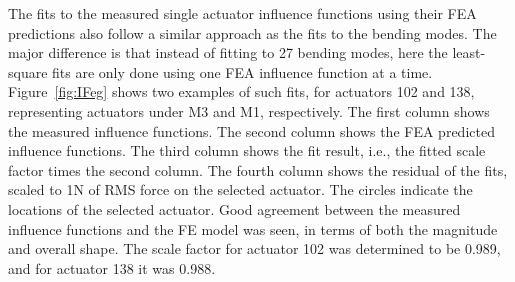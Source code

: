 \documentclass [twoside,openbib,12pt]{article}
\begin{document}
The fits to the measured single actuator influence functions using
their FEA predictions also
follow a similar approach as the fits to the bending modes.
The major difference is that instead of fitting to 27 bending modes,
here the least-square fits are only done using one FEA influence
function at a time.
Figure~\ref{fig:IFeg} shows two examples of such fits, for actuators
102 and 138, representing actuators under M3 and M1, respectively.
The first column shows the measured influence functions.
The second column shows the FEA predicted influence functions.
The third column shows the fit result, i.e., the fitted scale factor
times the second column.
The fourth column shows the residual of the fits, scaled to 1N of
RMS force on the selected actuator.
The circles indicate the locations of the selected actuator.
Good agreement between the measured influence functions and the FE
model was seen, in terms of both the magnitude and overall shape.
The scale factor for actuator 102 was determined to be 0.989, and for
actuator 138 it was 0.988.
\end{document}
